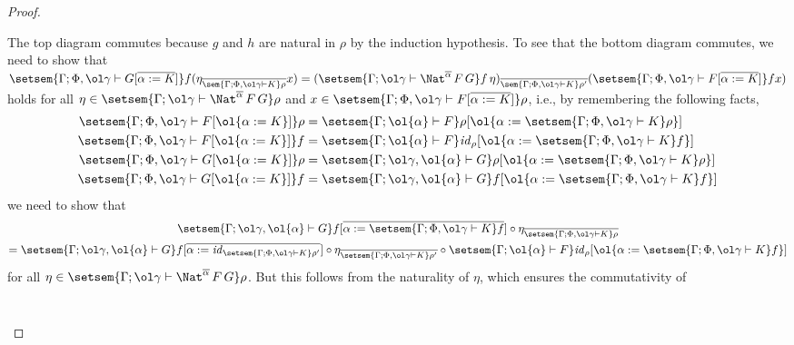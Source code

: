 \documentclass[acmsmall,review,anonymous]{acmart}
\theoremstyle{definition}
\renewcommand{\id}{\mathit{id}}
\begin{document}
\begin{proof}
\begin{itemize}
\noindent
The top diagram commutes because $g$ and $h$ are natural in $\rho$ by
the induction hypothesis.
To see that the bottom diagram commutes,
we need to show that
$\setsem{\Gamma;\Phi , \ol\gamma \vdash G [\overline{\alpha := K}]}f
(\eta_{\overline{\sem{\Gamma;\Phi, \ol\gamma \vdash K}\rho}} x) =
(\setsem{\Gamma;\ol\gamma\vdash \Nat^{\overline{\alpha}} \,F \,G} f\, \eta
)_{\overline{\sem{\Gamma;\Phi, \ol\gamma \vdash K}\rho'}}
(\setsem{\Gamma;\Phi , \ol\gamma \vdash F [\overline{\alpha := K}]}f x)$
holds for all $\eta \in \setsem{\Gamma;\ol\gamma\vdash
  \Nat^{\overline{\alpha}} \,F \,G}\rho$ and $x \in
\setsem{\Gamma;\Phi , \ol\gamma \vdash F [\overline{\alpha := K}]}\rho$,
i.e.,
by remembering the following facts,
\begin{align*}
\setsem{\Gamma;\Phi , \ol\gamma \vdash F[\ol{\alpha := K}]}\rho
&= \setsem{\Gamma; \ol{\alpha} \vdash F}\rho[\ol{\alpha :=
    \setsem{\Gamma;\Phi , \ol\gamma \vdash K}\rho}] \\
\setsem{\Gamma;\Phi
  , \ol\gamma \vdash F[\ol{\alpha := K}]}f
&= \setsem{\Gamma; \ol{\alpha} \vdash F}
  \id_{\rho} [\ol{\alpha := \setsem{\Gamma;\Phi , \ol\gamma \vdash K}f}] \\
\setsem{\Gamma;\Phi , \ol\gamma \vdash G[\ol{\alpha := K}]}\rho
&= \setsem{\Gamma; \ol\gamma ,\ol{\alpha} \vdash G}\rho[\ol{\alpha :=
    \setsem{\Gamma;\Phi , \ol\gamma \vdash K}\rho}] \\
\setsem{\Gamma;\Phi , \ol\gamma \vdash G[\ol{\alpha := K}]}f
&= \setsem{\Gamma; \ol\gamma , \ol{\alpha} \vdash
  G} f [\ol{\alpha := \setsem{\Gamma;\Phi , \ol\gamma \vdash K}f}]
\end{align*}
we need to show that
\begin{multline*}
\setsem{\Gamma;\ol\gamma, \ol{\alpha} \vdash G} f[\overline{\alpha := \setsem{\Gamma;\Phi, \ol\gamma \vdash K} f }]
  \circ
\eta_{\overline{\setsem{\Gamma;\Phi, \ol\gamma \vdash K}\rho}} \\
=
\setsem{\Gamma;\ol\gamma, \ol{\alpha} \vdash G} f[\overline{\alpha := \id_{\setsem{\Gamma;\Phi, \ol\gamma \vdash K}\rho'}}]
\circ
\eta_{\overline{\setsem{\Gamma;\Phi, \ol\gamma \vdash K}\rho'}}
\circ
\setsem{\Gamma; \ol{\alpha} \vdash F} \id_{\rho} [\ol{\alpha := \setsem{\Gamma;\Phi, \ol\gamma \vdash K}f}]
\end{multline*}
for all $\eta \in \setsem{\Gamma;\ol\gamma \vdash
  \Nat^{\overline{\alpha}} \,F \,G}\rho$.
But this follows from the naturality of $\eta$, which ensures the commutativity of
{\footnotesize
\[\begin{tikzcd}[column sep = large]

\end{tikzcd}\]}
\end{itemize}
\end{proof}
\end{document}
